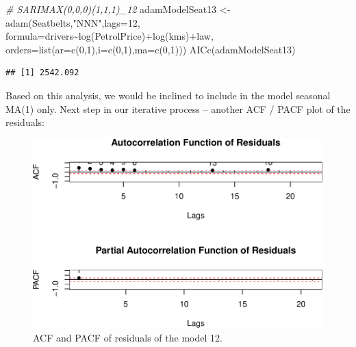\documentclass[
]{book}
\newenvironment{Shaded}{\begin{snugshade}}{\end{snugshade}}
\newcommand{\AttributeTok}[1]{\textcolor[rgb]{0.77,0.63,0.00}{#1}}
\newcommand{\CommentTok}[1]{\textcolor[rgb]{0.56,0.35,0.01}{\textit{#1}}}
\newcommand{\DecValTok}[1]{\textcolor[rgb]{0.00,0.00,0.81}{#1}}
\newcommand{\FunctionTok}[1]{\textcolor[rgb]{0.00,0.00,0.00}{#1}}
\newcommand{\NormalTok}[1]{#1}
\newcommand{\OtherTok}[1]{\textcolor[rgb]{0.56,0.35,0.01}{#1}}
\newcommand{\SpecialCharTok}[1]{\textcolor[rgb]{0.00,0.00,0.00}{#1}}
\newcommand{\StringTok}[1]{\textcolor[rgb]{0.31,0.60,0.02}{#1}}
\theoremstyle{definition}
\theoremstyle{definition}
\theoremstyle{definition}
\theoremstyle{definition}
\theoremstyle{remark}
\begin{document}
\begin{Shaded}
\begin{Highlighting}[]
\CommentTok{\# SARIMAX(0,0,0)(1,1,1)\_12}
\NormalTok{adamModelSeat13 }\OtherTok{\textless{}{-}} \FunctionTok{adam}\NormalTok{(Seatbelts,}\StringTok{"NNN"}\NormalTok{,}\AttributeTok{lags=}\DecValTok{12}\NormalTok{,}
                        \AttributeTok{formula=}\NormalTok{drivers}\SpecialCharTok{\textasciitilde{}}\FunctionTok{log}\NormalTok{(PetrolPrice)}\SpecialCharTok{+}\FunctionTok{log}\NormalTok{(kms)}\SpecialCharTok{+}\NormalTok{law,}
                        \AttributeTok{orders=}\FunctionTok{list}\NormalTok{(}\AttributeTok{ar=}\FunctionTok{c}\NormalTok{(}\DecValTok{0}\NormalTok{,}\DecValTok{1}\NormalTok{),}\AttributeTok{i=}\FunctionTok{c}\NormalTok{(}\DecValTok{0}\NormalTok{,}\DecValTok{1}\NormalTok{),}\AttributeTok{ma=}\FunctionTok{c}\NormalTok{(}\DecValTok{0}\NormalTok{,}\DecValTok{1}\NormalTok{)))}
\FunctionTok{AICc}\NormalTok{(adamModelSeat13)}
\end{Highlighting}
\end{Shaded}

\begin{verbatim}
## [1] 2542.092
\end{verbatim}

Based on this analysis, we would be inclined to include in the model seasonal MA(1) only. Next step in our iterative process -- another ACF / PACF plot of the residuals:

\begin{figure}
\centering
\includegraphics{Svetunkov--2022----ADAM_files/figure-latex/adamModelSeat13ACFPACF-1.pdf}
\caption{\label{fig:adamModelSeat13ACFPACF}ACF and PACF of residuals of the model 12.}
\end{figure}
\end{document}
